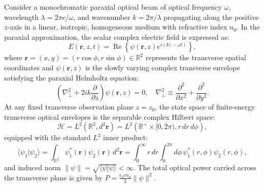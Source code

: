 \documentclass[11pt,a4paper]{article}
\begin{document}
Consider a monochromatic paraxial optical beam of optical frequency $\omega$, wavelength $\lambda = 2\pi c / \omega$, and wavenumber $k = 2\pi / \lambda$ propagating along the positive $z$-axis in a linear, isotropic, homogeneous medium with refractive index $n_0$. In the paraxial approximation, the scalar complex electric field is expressed as:
\begin{equation}
E(\mathbf{r}, z, t) = \operatorname{Re}\left\{ \psi(\mathbf{r}, z) e^{i(k z - \omega t)} \right\},
\label{eq:paraxial_field_rep}
\end{equation}
where $\mathbf{r} = (x, y) = (r\cos\phi, r\sin\phi) \in \mathbb{R}^2$ represents the transverse spatial coordinates and $\psi(\mathbf{r}, z)$ is the slowly varying complex transverse envelope satisfying the paraxial Helmholtz equation:
\begin{equation}
\left( \nabla_\perp^2 + 2 i k \frac{\partial}{\partial z} \right) \psi(\mathbf{r}, z) = 0, \quad \nabla_\perp^2 \equiv \frac{\partial^2}{\partial x^2} + \frac{\partial^2}{\partial y^2}.
\label{eq:paraxial_helmholtz}
\end{equation}
At any fixed transverse observation plane $z = z_0$, the state space of finite-energy transverse optical envelopes is the separable complex Hilbert space:
\begin{equation}
\mathcal{H} = L^2(\mathbb{R}^2, d^2\mathbf{r}) = L^2\left(\mathbb{R}^+ \times [0, 2\pi), r \, dr \, d\phi\right),
\label{eq:hilbert_space_def}
\end{equation}
equipped with the standard $L^2$ inner product:
\begin{equation}
\langle \psi_1 | \psi_2 \rangle = \int_{\mathbb{R}^2} \psi_1^*(\mathbf{r}) \psi_2(\mathbf{r}) \, d^2\mathbf{r} = \int_0^\infty r \, dr \int_0^{2\pi} d\phi \, \psi_1^*(r, \phi) \psi_2(r, \phi),
\label{eq:inner_product_def}
\end{equation}
and induced norm $\|\psi\| = \sqrt{\langle \psi | \psi \rangle} < \infty$. The total optical power carried across the transverse plane is given by $P = \frac{\epsilon_0 c n_0}{2} \|\psi\|^2$.
\end{document}
